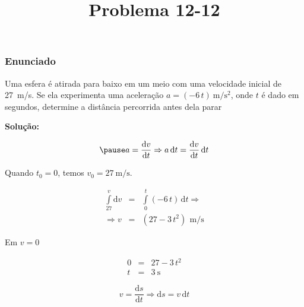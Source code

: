 \documentclass[12pt]{beamer}
\begin{document}
	\title{Problema 12-12}
\begin{frame}[plain]
	\maketitle
\end{frame}

\begin{frame}
	\frametitle{Enunciado}
	
	\begin{minipage}{.7\linewidth}
		Uma esfera é atirada para baixo em um meio com uma velocidade inicial de \SI{27}{\meter/\second}. Se ela experimenta uma aceleração $a=(-6\,t)\SI{}{\meter/\second^{2}}$, onde $t$ é dado em segundos, determine a distância percorrida antes dela parar \pause
	\end{minipage}
	\begin{minipage}{.2\linewidth}
		\begin{center}
		\end{center}
	\end{minipage}
	
	\vspace{.2cm}
	\textbf{Solução:}
	
	\begin{equation}\pause
		a=\dfrac{\text{d}v}{\text{d}t} \Rightarrow a\,\text{d}t=\dfrac{\text{d}v}{\text{d}t}\,\text{d}t
	\end{equation}
\end{frame}

\begin{frame}
	Quando $t_{0}=0$, temos $v_{0}=\SI{27}{\meter/\second}$.
	
	\begin{eqnarray}
		\int\limits_{27}^{v}\text{d}v&=&\int\limits_{0}^{t}(-6\,t)\,\text{d}t \Rightarrow\\
		\Rightarrow v&=&(27-3\,t^{2})\,\SI{}{\meter/\second}
	\end{eqnarray}
	
	Em $v=0$
	
	\begin{eqnarray}
		0&=&27-3\,t^{2}\\
		t&=&\SI{3}{\second}
	\end{eqnarray}

	\begin{equation}
		v=\dfrac{\text{d}s}{\text{d}t} \Rightarrow \text{d}s=v\,\text{d}t
	\end{equation}
\end{frame}
\end{document}
